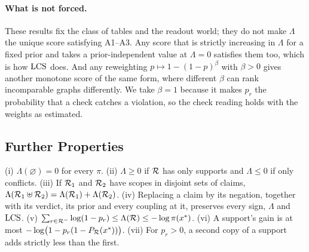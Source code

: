 \paragraph{What is not forced.} These results fix the class of tables and the readout world; they
do not make $\Lambda$ the unique score satisfying A1--A3. Any score that is strictly increasing in
$\Lambda$ for a fixed prior and takes a prior-independent value at $\Lambda=0$ satisfies them too,
which is how $\mathrm{LCS}$ does. And any reweighting $p\mapsto1-(1-p)^\beta$ with $\beta>0$ gives another
monotone score of the same form, where different $\beta$ can rank incomparable graphs differently.
We take $\beta=1$ because it makes $p_r$ the probability that a check catches a violation, so the
check reading holds with the weights as estimated.

\subsection{Further Properties}
\label{app:further}

\begin{proposition}
\label{prop:props}
\label{prop:basic}
\label{prop:neg}
\label{prop:sat}
(i) $\Lambda(\varnothing)=0$ for every $\pi$. (ii) $\Lambda\ge0$ if $\mathcal{R}$ has only supports and
$\Lambda\le0$ if only conflicts. (iii) If $\mathcal{R}_1$ and $\mathcal{R}_2$ have scopes in disjoint sets of claims,
$\Lambda(\mathcal{R}_1\uplus\mathcal{R}_2)=\Lambda(\mathcal{R}_1)+\Lambda(\mathcal{R}_2)$. (iv) Replacing a claim by its negation,
together with its verdict, its prior and every coupling at it, preserves every sign, $\Lambda$ and
$\mathrm{LCS}$. (v) $\sum_{r\in\mathcal{R}^{-}}\log(1-p_r)\le\Lambda(\mathcal{R})\le-\log\pi(x^{\ast})$. (vi) A support's gain is
at most $-\log\bigl(1-p_r(1-P_{\mathcal{R}}(x^{\ast}))\bigr)$. (vii) For $p_r>0$, a second copy of a support adds
strictly less than the first.
\end{proposition}

